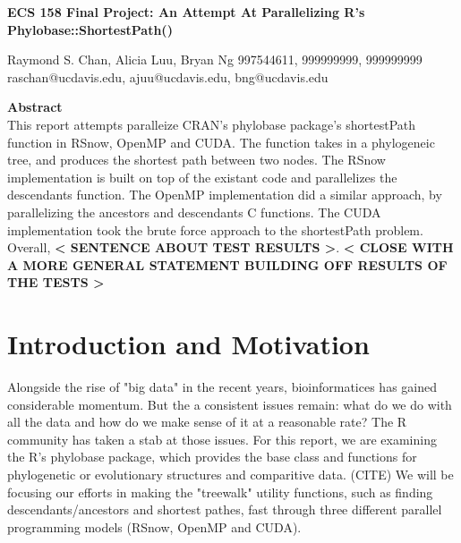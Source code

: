 \documentclass[11pt,letterpaper]{article}
\begin{document}
\begin{center}
{\huge \textbf{ECS 158 Final Project: An Attempt At Parallelizing R's Phylobase::ShortestPath()}\\
\vspace{5mm}
\begin{Large}
Raymond S. Chan, Alicia Luu, Bryan Ng
997544611, 999999999, 999999999\\
raschan@ucdavis.edu, ajuu@ucdavis.edu, bng@ucdavis.edu\\
\end{Large}}
\end{center}


\vspace{5mm}

\begin{center}
	\begin{large}
		\textbf{Abstract}\\
		This report attempts paralleize CRAN's phylobase package's shortestPath function in RSnow, OpenMP and CUDA. The function takes in a phylogeneic tree, and produces the shortest path between two nodes. The RSnow implementation is built on top of the existant code and parallelizes the descendants function. The OpenMP implementation did a similar approach, by parallelizing the ancestors and descendants C functions. The CUDA implementation took the brute force approach to the  shortestPath problem. Overall, \textbf{< SENTENCE ABOUT TEST RESULTS >}. \textbf{< CLOSE WITH A MORE GENERAL STATEMENT BUILDING OFF RESULTS OF THE TESTS >} 
	\end{large}
	

\end{center}

\section{Introduction and Motivation}
 
Alongside the rise of "big data" in the recent years, bioinformatices has gained considerable momentum. But the a consistent issues remain: what do we do with all the data and how do we make sense of it at a reasonable rate? The R community has taken a stab at those issues. For this report, we are examining the R's phylobase package, which provides the base class and functions for phylogenetic or evolutionary structures and comparitive data. (CITE) We will be focusing our efforts in making the "treewalk" utility functions, such as finding descendants/ancestors and shortest pathes, fast through three different parallel programming models (RSnow, OpenMP and CUDA).  
\end{document}
